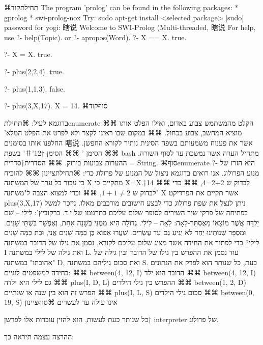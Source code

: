 ⌘תחילת{קוד}
The program 'prolog' can be found in the following packages:
* gprolog
* swi-prolog-nox
Try: sudo apt-get install <selected package>
[sudo] password for yogi:
瞎说
Welcome to SWI-Prolog (Multi-threaded, 瞎说
For help, use ?- help(Topic). or ?- apropos(Word).
?- X == X.
true.

?- X = X.
true.

?- plus(2,2,4).
true.

?- plus(1,1,3).
false.

?- plus(3,X,17).
X = 14.
⌘סוף{קוד}

בדוגמא לעיל:
⌘תחילת{enumerate}
⌘⌘ הקלט מהמשתמש צבוע באדום, ואילו הפלט אותו מוציא המחשב, צבוע בכחול.
⌘⌘ במקום שבו ראינו לקצר ולא לפרט את הפלט המלא' החלפנו אותו בסימנים 瞎说 אשר את פענוח משמעותם בשפה הסינית נותיר לקורא החפשן.
⌘⌘ הסימן '%
⌘⌘  הסימן †{12}'＃' בשפת bash מתחיל הערה אשר נמשכת עד לסוף השורה. ההערות צבועות בירוק.
⌘⌘ הסדרית†{סדרית = String.}
⌘סוף{enumerate}
?-
      היא הזרז של מנוע הפרולוג.
      אנו רואים בדוגמא ניצול של המנוע של פרולוג כדי:
      ⌘תחילת{ציינון}
      ⌘⌘ להוכיח כי עבור כל ערך של המשתנה X מתקיים כי X=X.†{14}
      ⌘⌘ לבדוק ש 2+2=4,
      ⌘⌘ כדי לבדוק ש $1+1≠2$,
      ⌘⌘ וכדי למצוא הצבה ל"משתנה" X אשר תקיים את הפרדיקט
      plus(3,X,17)
      ניתן לנצל את שפת פרולוג כדי לבצע חישובים מורכבים מאלו. ניזכר למשל בפתיחה של פרקי שיר השירים לסופר שלום עליכם בתרגומו של י.ד. ברקוביץ':
      לִילִי – שֵׁם יַלְדָּה אֲשֶׁר מוֹצָאוֹ מֵאֶסְתֵּר-לֵאָה: לֵאָה – לִילִי. גְּדוֹלָה הִיא מִמֶּנִּי בְּשָׁנָה אַחַת, וְאֶפְשָׁר בִּשְׁתֵּי שָׁנִים. וּמִסְפָּר שְׁנוֹתֵינוּ יַחַד לֹא יַגִּיעַ גַּם עַד עֶשְׂרִים. שַׁעֲרוּ אֵפוֹא בֶּן כַּמָּה שָׁנִים אֲנִי, וּבַת כַּמָּה שָׁנִים לִילִי?
      כדי לפתור את החידה אשר מציג שלום עליכם לקורא, נסמן את גילו של הדובר במשתנה I ואת גילה של לילי במשתנה L. עוד נסמן את ההפרש בין גילו של הדובר ובין גילה של "אהובתו" במשתנה D, ואת סכום גיליהם במשתנה S.
      כעת, כל שנותר הוא לפרק את הנתונים בחידה למשפטים לוגיים:
      ⌘⌘ between(4, 12, I) הדובר הוא ילד
      ⌘⌘ between(4, 12, I) גם לילי היא ילדה
      ⌘⌘ plus(I, D, L) ההפרש בין גילי הילדים
      ⌘⌘ between(1, 2, D) הפרש זה הוא בין שנה או שנתיים
      ⌘⌘ plus(I, L, S) סכום גילי הילדים
      ⌘⌘ between(0, 19, S) אינו עולה עד לעשרים
    ⌘סוף{ציינון}

      כל שנותר כעת לעשות, הוא להזין עובדות אלו לפרשן†{ interpreter} של פרולוג.

      ההרצה עצמה תיראה כך:

